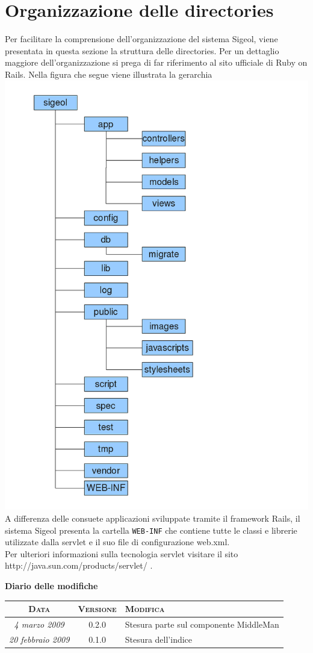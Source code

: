 \documentclass[11pt,a4paper]{article}
\newcommand{\modifiche} 
{
\newpage
\begin{center}
\textbf{Diario delle modifiche} \\
\bigskip
\begin{tabular}{|c|c|p{0.51\textwidth}|}
\hline
\textsc{Data} & \textsc{Versione} & \textsc{Modifica} \\
\hline
\hline
\textit{4 marzo 2009} & 0.2.0 & Stesura parte sul componente MiddleMan \\
\hline
\textit{20 febbraio 2009} & 0.1.0 & Stesura dell'indice \\
\hline
\end{tabular}
\end{center}
}
\begin{document}
\section{Organizzazione delle directories}
Per facilitare la comprensione dell'organizzazione del sistema Sigeol, viene presentata in questa sezione la struttura delle directories. Per un dettaglio maggiore dell'organizzazione si prega di far riferimento al sito ufficiale di Ruby on Rails. Nella figura che segue viene illustrata la gerarchia \\
\includegraphics[scale=0.59]{images/gerarchiacartelle.png}
A differenza delle consuete applicazioni sviluppate tramite il framework Rails, il sistema Sigeol presenta la cartella \verb|WEB-INF| che contiene tutte le classi e librerie utilizzate dalla servlet e il suo file di configurazione web.xml.\\ Per ulteriori informazioni sulla tecnologia servlet visitare il sito http://java.sun.com/products/servlet/ .
\modifiche
\end{document}
